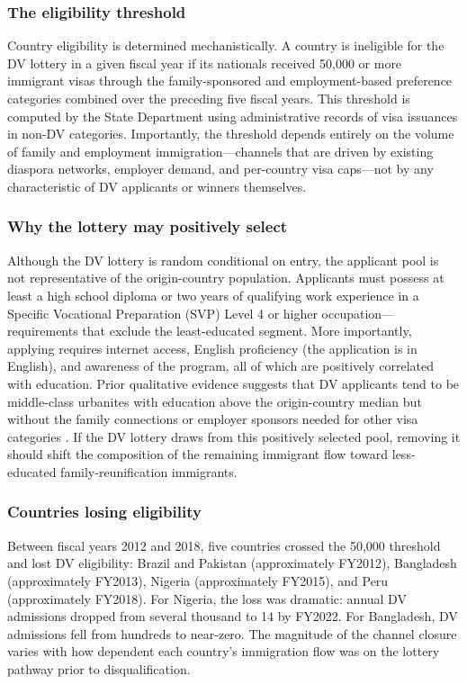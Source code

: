 \documentclass[12pt]{article}
\begin{document}
\subsubsection*{The eligibility threshold} Country eligibility is determined mechanistically. A country is ineligible for the DV lottery in a given fiscal year if its nationals received 50,000 or more immigrant visas through the family-sponsored and employment-based preference categories combined over the preceding five fiscal years. This threshold is computed by the State Department using administrative records of visa issuances in non-DV categories. Importantly, the threshold depends entirely on the volume of family and employment immigration---channels that are driven by existing diaspora networks, employer demand, and per-country visa caps---not by any characteristic of DV applicants or winners themselves.

\subsubsection*{Why the lottery may positively select} Although the DV lottery is random conditional on entry, the applicant pool is not representative of the origin-country population. Applicants must possess at least a high school diploma or two years of qualifying work experience in a Specific Vocational Preparation (SVP) Level 4 or higher occupation---requirements that exclude the least-educated segment. More importantly, applying requires internet access, English proficiency (the application is in English), and awareness of the program, all of which are positively correlated with education. Prior qualitative evidence suggests that DV applicants tend to be middle-class urbanites with education above the origin-country median but without the family connections or employer sponsors needed for other visa categories \citep{Orrenius2020}. If the DV lottery draws from this positively selected pool, removing it should shift the composition of the remaining immigrant flow toward less-educated family-reunification immigrants.

\subsubsection*{Countries losing eligibility} Between fiscal years 2012 and 2018, five countries crossed the 50,000 threshold and lost DV eligibility: Brazil and Pakistan (approximately FY2012), Bangladesh (approximately FY2013), Nigeria (approximately FY2015), and Peru (approximately FY2018). For Nigeria, the loss was dramatic: annual DV admissions dropped from several thousand to 14 by FY2022. For Bangladesh, DV admissions fell from hundreds to near-zero. The magnitude of the channel closure varies with how dependent each country's immigration flow was on the lottery pathway prior to disqualification.
\end{document}
